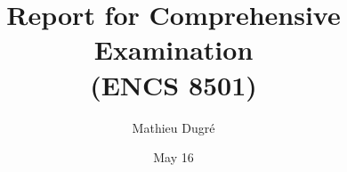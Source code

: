 \documentclass{report}
\title{Report for Comprehensive Examination\\(ENCS 8501)}
\author{Mathieu Dugr\'e}
\date{May 16}  %
\begin{document}

\begin{titlepage}
	\maketitle 
	\thispagestyle{empty}
\end{titlepage}

\tableofcontents

\clearpage
{}







% 

\end{document}
